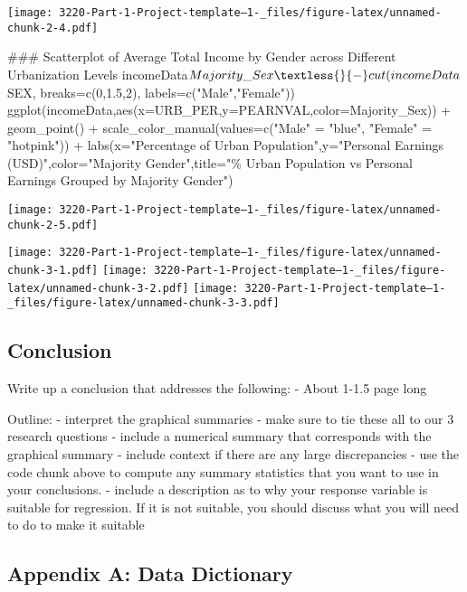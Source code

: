 \documentclass[
  12pt,
]{article}
\newenvironment{Shaded}{\begin{snugshade}}{\end{snugshade}}
\newcommand{\NormalTok}[1]{#1}
\begin{document}
\texttt{[image: 3220-Part-1-Project-template--1-\_files/figure-latex/unnamed-chunk-2-4.pdf]}

\begin{Shaded}
\begin{Highlighting}[]
\NormalTok{\#\#\# Scatterplot of Average Total Income by Gender across Different Urbanization Levels}
\NormalTok{incomeData$Majority\_Sex\textless{}{-}cut(incomeData$SEX,}
\NormalTok{                             breaks=c(0,1.5,2),}
\NormalTok{                             labels=c("Male","Female"))}
\NormalTok{ggplot(incomeData,aes(x=URB\_PER,y=PEARNVAL,color=Majority\_Sex)) +}
\NormalTok{  geom\_point() +}
\NormalTok{  scale\_color\_manual(values=c("Male" = "blue",}
\NormalTok{                              "Female" = "hotpink")) +}
\NormalTok{  labs(x="Percentage of Urban Population",y="Personal Earnings (USD)",color="Majority Gender",title="\% Urban Population vs Personal Earnings Grouped by Majority Gender")}
\end{Highlighting}
\end{Shaded}

\texttt{[image: 3220-Part-1-Project-template--1-\_files/figure-latex/unnamed-chunk-2-5.pdf]}

\texttt{[image: 3220-Part-1-Project-template--1-\_files/figure-latex/unnamed-chunk-3-1.pdf]}
\texttt{[image: 3220-Part-1-Project-template--1-\_files/figure-latex/unnamed-chunk-3-2.pdf]}
\texttt{[image: 3220-Part-1-Project-template--1-\_files/figure-latex/unnamed-chunk-3-3.pdf]}

\hypertarget{conclusion}{%
\subsection{Conclusion}\label{conclusion}}

Write up a conclusion that addresses the following: - About 1-1.5 page
long

Outline: - interpret the graphical summaries - make sure to tie these
all to our 3 research questions - include a numerical summary that
corresponds with the graphical summary - include context if there are
any large discrepancies - use the code chunk above to compute any
summary statistics that you want to use in your conclusions. - include a
description as to why your response variable is suitable for regression.
If it is not suitable, you should discuss what you will need to do to
make it suitable

\newpage

\hypertarget{appendix-a-data-dictionary}{%
\subsection{Appendix A: Data
Dictionary}\label{appendix-a-data-dictionary}}
\end{document}
